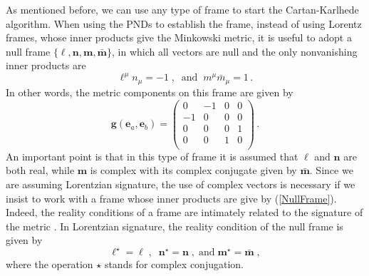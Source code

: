 \documentclass[twocolumn,prd,aps,showpacs,showkeys,amsmath,amssymb]{revtex4-1}
\newcommand{\bl}{\boldsymbol}
\begin{document}
As mentioned before, we can use any type of frame to start the Cartan-Karlhede algorithm. When using the PNDs to establish the frame, instead of using Lorentz frames, whose inner products give the Minkowski metric, it is useful to adopt a null frame $\{\bl{\ell}, \bl{n}, \bl{m}, \bl{\bar{m}}\}$, in which all vectors are null and the only nonvanishing inner products are
\begin{equation*}
  \ell^\mu n_\mu =-1 \;,\;\; \textrm{and} \;\; m^\mu \bar{m}_\mu =1\,.
\end{equation*}
In other words, the metric components on this frame are given by
\begin{equation}\label{NullFrame}
 \bl{g}(\bl{e}_a,\bl{e}_b) =  \left(
                 \begin{array}{cccc}
                   0 & -1 & 0 & 0 \\
                   -1 & 0 & 0 & 0 \\
                   0 & 0 & 0 & 1 \\
                   0 & 0 & 1 & 0 \\
                 \end{array}
               \right)\,.
\end{equation}
An important point is that in this type of frame it is assumed that $\bl{\ell}$ and $\bl{n}$ are both real, while $\bl{m}$ is complex with its complex conjugate given by  $\bl{\bar{m}}$. Since we are assuming Lorentzian signature, the use of complex vectors is necessary if we insist to work with a frame whose inner products are give by (\ref{NullFrame}). Indeed, the reality conditions of a frame are intimately related to the signature of the metric \cite{Trautman,art1}. In Lorentzian signature, the reality condition of the null frame is given by
$$ \bl{\ell}^\star = \bl{\ell}\;,\;\;\bl{n}^\star = \bl{n}\;, \; \text{and}\; \bl{m}^\star = \bl{\bar{m}}\;,  $$
where the operation $\star$ stands for complex conjugation.
\end{document}
